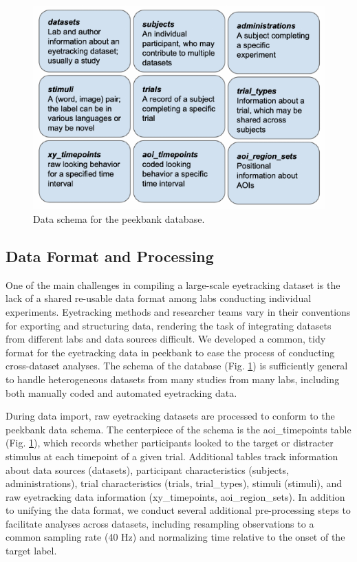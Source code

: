 \documentclass[10pt, letterpaper]{article}
\newenvironment{CodeChunk}{}{}
\begin{document}
\begin{CodeChunk}
\begin{figure}[tb]

{\centering \includegraphics{figs/fig_schema-1}

}

\caption[Data schema for the peekbank database]{Data schema for the peekbank database.}\label{fig:fig_schema}
\end{figure}
\end{CodeChunk}

\hypertarget{data-format-and-processing}{%
\subsection{Data Format and
Processing}\label{data-format-and-processing}}

One of the main challenges in compiling a large-scale eyetracking
dataset is the lack of a shared re-usable data format among labs
conducting individual experiments. Eyetracking methods and researcher
teams vary in their conventions for exporting and structuring data,
rendering the task of integrating datasets from different labs and data
sources difficult. We developed a common, tidy format for the
eyetracking data in peekbank to ease the process of conducting
cross-dataset analyses. The schema of the database (Fig.
\ref{fig:fig_schema}) is sufficiently general to handle heterogeneous
datasets from many studies from many labs, including both manually coded
and automated eyetracking data.

During data import, raw eyetracking datasets are processed to conform to
the peekbank data schema. The centerpiece of the schema is the
aoi\_timepoints table (Fig. \ref{fig:fig_schema}), which records whether
participants looked to the target or distracter stimulus at each
timepoint of a given trial. Additional tables track information about
data sources (datasets), participant characteristics (subjects,
administrations), trial characteristics (trials, trial\_types), stimuli
(stimuli), and raw eyetracking data information (xy\_timepoints,
aoi\_region\_sets). In addition to unifying the data format, we conduct
several additional pre-processing steps to facilitate analyses across
datasets, including resampling observations to a common sampling rate
(40 Hz) and normalizing time relative to the onset of the target label.
\end{document}

